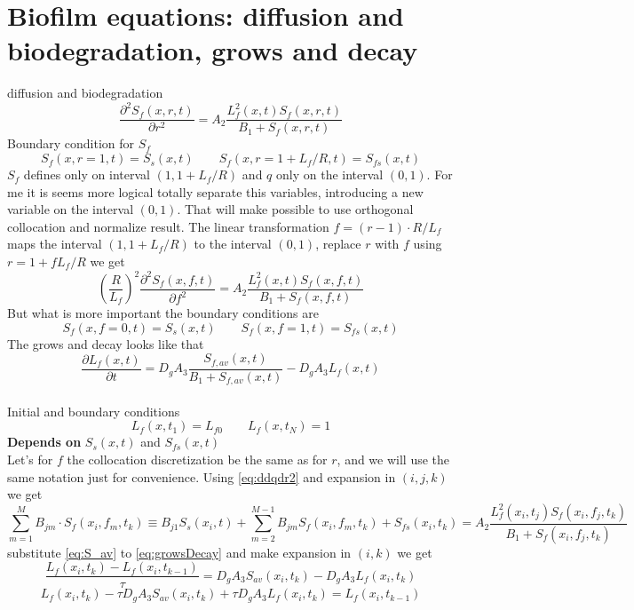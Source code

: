 \documentclass[12pt]{article}
\begin{document}
\section{Biofilm equations: diffusion and biodegradation, grows and decay }
diffusion and biodegradation
\begin{equation}
\frac{\partial^2 S_f(x,r,t)}{\partial r^2}=A_2\frac{L_f^2(x,t)S_f(x,r,t)}{B_1+S_f(x,r,t)}
\end{equation}
Boundary condition for $S_f$
\begin{equation}\label{eq:SfB}
 	S_f(x,r=1,t)=S_s(x, t) \qquad S_f(x,r=1+L_f/R,t) = S_{fs}(x, t) 
\end{equation}
$S_f$ defines only on interval $(1, 1+L_f/R)$ and $q$ only on the interval $(0, 1)$. For me it is seems more logical totally separate this variables, introducing a new variable on the interval $(0,1)$. That will make possible to use orthogonal collocation and normalize result. The linear transformation $f=(r - 1)\cdot R/L_f$ maps the interval $(1, 1+L_f/R)$ to the interval $(0,1)$, replace $r$ with $f$ using $r=1+fL_f/R$ we get\\
\begin{equation}
\left(\frac{R}{L_f}\right)^2\frac{\partial^2 S_f(x,f,t)}{\partial f^2}=A_2\frac{L_f^2(x,t)S_f(x,f,t)}{B_1+S_f(x,f,t)}
\end{equation}
But what is more important the boundary conditions are
\begin{equation}\label{eq:SfB}
S_f(x,f=0,t)=S_s(x, t) \qquad S_f(x,f=1,t) = S_{fs}(x, t) 
\end{equation}
The grows and decay looks like that
\begin{equation}\label{eq:growsDecay}
\frac{\partial L_f(x,t)}{\partial t}=D_gA_3\frac{S_{f,av}(x,t)}{B_1+S_{f,av}(x,t)}-D_gA_3L_f{(x,t)}
\end{equation}\\	 
Initial and boundary conditions
\begin{equation}\label{eq:biofilmB}
L_f(x, t_1) = L_{f0}
\qquad
L_f(x, t_N) = 1 
\end{equation}
\textbf{Depends on} $S_s(x,t)$ and $S_{fs}(x,t)$\\
Let's for $f$ the collocation discretization be the same as for $r$, and we will use the same notation just for convenience. Using \eqref{eq:ddqdr2} and expansion in $(i,j,k)$ we get
\begin{equation}
\sum_{m=1}^MB_{jm}\cdot S_f(x_i,f_m,t_k)\equiv B_{j1}S_s(x_i, t) + \sum_{m=2}^{M-1}B_{jm}S_f(x_i,f_m,t_k)+S_{fs}(x_i, t_k)=
A_2\frac{L_f^2(x_i,t_j)S_f(x_i,f_j,t_k)}{B_1+S_f(x_i,f_j,t_k)}
\end{equation}
substitute \eqref{eq:S_av} to \eqref{eq:growsDecay} and make expansion in $(i, k)$ we get
\begin{equation}
\frac{L_f(x_i,t_k)-L_f(x_i,t_{k-1})}{\tau}=D_gA_3S_{av}(x_i, t_k)-D_gA_3L_f{(x_i,t_k)}
\end{equation}
\begin{equation}
	L_f(x_i,t_k)-\tau D_gA_3S_{av}(x_i, t_k)+\tau D_gA_3L_f{(x_i,t_k)}=
	L_f(x_i,t_{k-1})
\end{equation}
\end{document}
